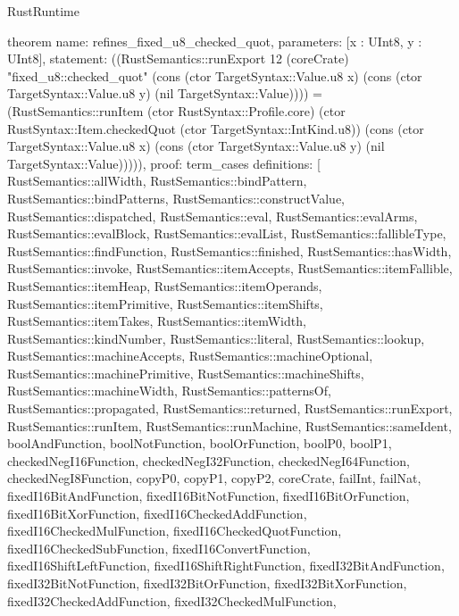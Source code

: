 \begin{lexlean}{RustRuntime}
\begin{semanticmodule}
theorem{
  name: refines_fixed_u8_checked_quot,
  parameters: [x : UInt8, y : UInt8],
  statement: ((RustSemantics::runExport 12 (coreCrate) "fixed_u8::checked_quot" (cons (ctor TargetSyntax::Value.u8 x) (cons (ctor TargetSyntax::Value.u8 y) (nil TargetSyntax::Value)))) = (RustSemantics::runItem (ctor RustSyntax::Profile.core) (ctor RustSyntax::Item.checkedQuot (ctor TargetSyntax::IntKind.u8)) (cons (ctor TargetSyntax::Value.u8 x) (cons (ctor TargetSyntax::Value.u8 y) (nil TargetSyntax::Value))))),
  proof: term_cases{
    definitions: [
      RustSemantics::allWidth,
      RustSemantics::bindPattern,
      RustSemantics::bindPatterns,
      RustSemantics::constructValue,
      RustSemantics::dispatched,
      RustSemantics::eval,
      RustSemantics::evalArms,
      RustSemantics::evalBlock,
      RustSemantics::evalList,
      RustSemantics::fallibleType,
      RustSemantics::findFunction,
      RustSemantics::finished,
      RustSemantics::hasWidth,
      RustSemantics::invoke,
      RustSemantics::itemAccepts,
      RustSemantics::itemFallible,
      RustSemantics::itemHeap,
      RustSemantics::itemOperands,
      RustSemantics::itemPrimitive,
      RustSemantics::itemShifts,
      RustSemantics::itemTakes,
      RustSemantics::itemWidth,
      RustSemantics::kindNumber,
      RustSemantics::literal,
      RustSemantics::lookup,
      RustSemantics::machineAccepts,
      RustSemantics::machineOptional,
      RustSemantics::machinePrimitive,
      RustSemantics::machineShifts,
      RustSemantics::machineWidth,
      RustSemantics::patternsOf,
      RustSemantics::propagated,
      RustSemantics::returned,
      RustSemantics::runExport,
      RustSemantics::runItem,
      RustSemantics::runMachine,
      RustSemantics::sameIdent,
      boolAndFunction,
      boolNotFunction,
      boolOrFunction,
      boolP0,
      boolP1,
      checkedNegI16Function,
      checkedNegI32Function,
      checkedNegI64Function,
      checkedNegI8Function,
      copyP0,
      copyP1,
      copyP2,
      coreCrate,
      failInt,
      failNat,
      fixedI16BitAndFunction,
      fixedI16BitNotFunction,
      fixedI16BitOrFunction,
      fixedI16BitXorFunction,
      fixedI16CheckedAddFunction,
      fixedI16CheckedMulFunction,
      fixedI16CheckedQuotFunction,
      fixedI16CheckedSubFunction,
      fixedI16ConvertFunction,
      fixedI16ShiftLeftFunction,
      fixedI16ShiftRightFunction,
      fixedI32BitAndFunction,
      fixedI32BitNotFunction,
      fixedI32BitOrFunction,
      fixedI32BitXorFunction,
      fixedI32CheckedAddFunction,
      fixedI32CheckedMulFunction,
}}
\end{semanticmodule}
\end{lexlean}
